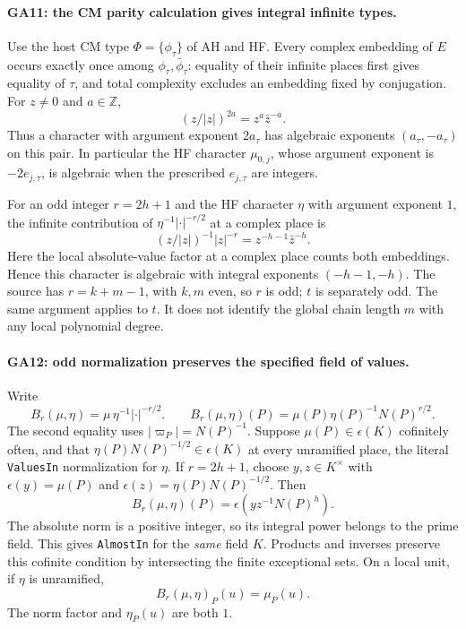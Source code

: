 \paragraph{GA11: the CM parity calculation gives integral infinite types.}
Use the host CM type $\Phi=\{\phi_\tau\}$ of AH and HF.
Every complex embedding of $E$ occurs exactly once among
$\phi_\tau,\bar\phi_\tau$: equality of their infinite places
first gives equality of $\tau$, and total complexity excludes
an embedding fixed by conjugation. For $z\ne0$ and $a\in\mathbb Z$,
\[
 (z/|z|)^{2a}=z^a\bar z^{-a}.                            \tag{GA.13}
\]
Thus a character with argument exponent $2a_\tau$ has
algebraic exponents $(a_\tau,-a_\tau)$ on this pair.
In particular the HF character $\mu_{0,j}$, whose argument
exponent is $-2e_{j,\tau}$, is algebraic when the prescribed
$e_{j,\tau}$ are integers.

For an odd integer $r=2h+1$ and the HF character $\eta$ with
argument exponent $1$, the infinite contribution of
$\eta^{-1}|\cdot|^{-r/2}$ at a complex place is
\[
 (z/|z|)^{-1}|z|^{-r}
       =z^{-h-1}\bar z^{-h}.                            \tag{GA.14}
\]
Here the local absolute-value factor at a complex place
counts both embeddings. Hence this character is algebraic
with integral exponents $(-h-1,-h)$.
The source has $r=k+m-1$, with $k,m$ even, so $r$ is odd;
$t$ is separately odd. The same argument applies to $t$.
It does not identify the global chain length $m$ with any
local polynomial degree.

\paragraph{GA12: odd normalization preserves the specified field of values.}
Write
\[
 B_r(\mu,\eta)=\mu\,\eta^{-1}|\cdot|^{-r/2}.
 \qquad
 B_r(\mu,\eta)(P)=\mu(P)\eta(P)^{-1}N(P)^{r/2}.           \tag{GA.15}
\]
The second equality uses $|\varpi_P|=N(P)^{-1}$.
Suppose $\mu(P)\in\epsilon(K)$ cofinitely often, and that
$\eta(P)N(P)^{-1/2}\in\epsilon(K)$ at every unramified
place, the literal \texttt{ValuesIn} normalization for
$\eta$. If $r=2h+1$, choose $y,z\in K^\times$ with
$\epsilon(y)=\mu(P)$ and
$\epsilon(z)=\eta(P)N(P)^{-1/2}$. Then
\[
 B_r(\mu,\eta)(P)=\epsilon(yz^{-1}N(P)^h).                \tag{GA.16}
\]
The absolute norm is a positive integer, so its integral
power belongs to the prime field. This gives
\texttt{AlmostIn} for the \emph{same} field $K$.
Products and inverses preserve this cofinite condition
by intersecting the finite exceptional sets.
On a local unit, if $\eta$ is unramified,
\[
 B_r(\mu,\eta)_P(u)=\mu_P(u).                            \tag{GA.17}
\]
The norm factor and $\eta_P(u)$ are both $1$.

